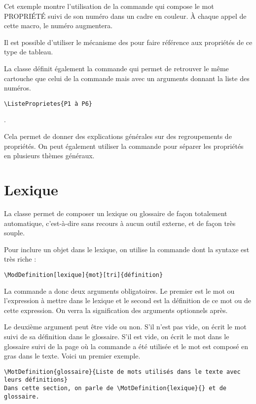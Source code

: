 \documentclass[nocrop]{sesamanuel}
\begin{document}
Cet exemple montre l'utilisation de la commande  qui
compose le mot \og PROPRIÉTÉ \fg{} suivi de son numéro dans un cadre
en couleur. À chaque appel de cette macro, le numéro augmentera. 

\begin{remarque}
Il
est possible d'utiliser le mécanisme des  pour faire
référence aux propriétés de ce type de tableau.
\end{remarque}

La classe définit également la commande  qui
permet de retrouver le même cartouche que celui de la commande
 mais avec un arguments donnant la liste des
numéros. 

\begin{code}
\begin{verbatim}
\ListeProprietes{P1 à P6}
\end{verbatim}
\end{code}
\begin{result}
 
\end{result}
. 

Cela permet de donner
des explications générales sur des regroupements de propriétés. On
peut également utiliser la commande  pour séparer les
propriétés en plusieurs thèmes généraux.

\section{Lexique}
\label{sec-lexique}
La classe  permet de composer un lexique ou glossaire
de façon totalement automatique, c'est-à-dire sans recours à aucun
outil externe, et de façon très souple.

Pour inclure un objet dans le lexique, on utilise la commande
 dont la syntaxe est très riche :
\begin{syntaxe}\verb+\ModDefinition[lexique]{mot}[tri]{définition}+

La commande a donc deux arguments obligatoires. Le premier est le mot
ou l'expression à mettre dans le lexique et le second est la
définition de ce mot ou de cette expression. On verra la signification
des arguments optionnels après.
\end{syntaxe}

Le deuxième argument peut être vide ou non. S'il n'est pas
vide, on écrit le mot suivi de sa définition dans le glossaire. S'il
est vide, on écrit le mot dans le glossaire suivi de la page où la
commande  a été utilisée et le mot est composé en
gras dans le texte. Voici un premier exemple.
\begin{code}
\begin{verbatim}
\MotDefinition{glossaire}{Liste de mots utilisés dans le texte avec leurs définitions}
Dans cette section, on parle de \MotDefinition{lexique}{} et de glossaire.
\end{verbatim}
\end{code}
\begin{result}
 
\end{result}
\end{document}
